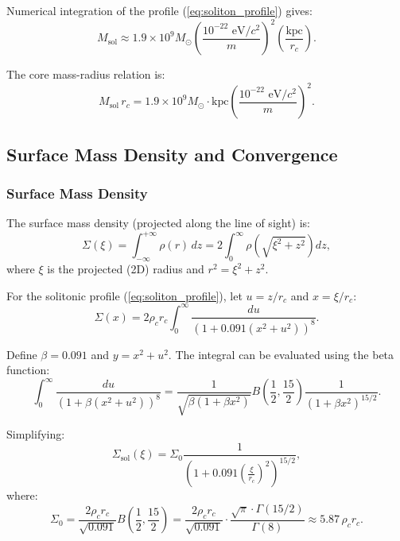 \documentclass[11pt,a4paper]{article}
\newcommand{\kpc}{\ensuremath{\mathrm{kpc}}}
\theoremstyle{definition}
\theoremstyle{remark}
\begin{document}
Numerical integration of the profile (\ref{eq:soliton_profile}) gives:
\begin{equation}
M_{\mathrm{sol}} \approx 1.9 \times 10^9 M_\odot \left(\frac{10^{-22} \text{ eV}/c^2}{m}\right)^2 \left(\frac{\kpc}{r_c}\right).
\end{equation}

The core mass-radius relation is:
\begin{equation}
\label{eq:mass_radius_relation}
M_{\mathrm{sol}} \, r_c = 1.9 \times 10^9 M_\odot \cdot \kpc \left(\frac{10^{-22} \text{ eV}/c^2}{m}\right)^2.
\end{equation}

\subsection{Surface Mass Density and Convergence}
\label{sec:convergence}

\subsubsection{Surface Mass Density}

The surface mass density (projected along the line of sight) is:
\begin{equation}
\Sigma(\xi) = \int_{-\infty}^{+\infty} \rho(r) \, dz = 2 \int_0^\infty \rho\left(\sqrt{\xi^2 + z^2}\right) dz,
\end{equation}
where $\xi$ is the projected (2D) radius and $r^2 = \xi^2 + z^2$.

For the solitonic profile (\ref{eq:soliton_profile}), let $u = z/r_c$ and $x = \xi/r_c$:
\begin{equation}
\Sigma(x) = 2\rho_c r_c \int_0^\infty \frac{du}{\left(1 + 0.091(x^2 + u^2)\right)^8}.
\end{equation}

Define $\beta = 0.091$ and $y = x^2 + u^2$. The integral can be evaluated using the beta function:
\begin{equation}
\int_0^\infty \frac{du}{(1 + \beta(x^2 + u^2))^8} = \frac{1}{\sqrt{\beta(1 + \beta x^2)}} B\left(\frac{1}{2}, \frac{15}{2}\right) \frac{1}{(1 + \beta x^2)^{15/2}}.
\end{equation}

Simplifying:
\begin{equation}
\label{eq:surface_density_sol}
\Sigma_{\mathrm{sol}}(\xi) = \Sigma_0 \frac{1}{\left(1 + 0.091 \left(\frac{\xi}{r_c}\right)^2\right)^{15/2}},
\end{equation}
where:
\begin{equation}
\Sigma_0 = \frac{2\rho_c r_c}{\sqrt{0.091}} B\left(\frac{1}{2}, \frac{15}{2}\right) = \frac{2\rho_c r_c}{\sqrt{0.091}} \cdot \frac{\sqrt{\pi} \cdot \Gamma(15/2)}{\Gamma(8)} \approx 5.87 \, \rho_c r_c.
\end{equation}
\end{document}
